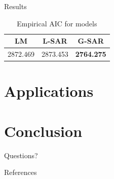 \documentclass[10pt,unknownkeysallowed]{beamer}
\begin{document}
\begin{frame}{Results}
\begin{table}[]
\begin{tabular}{ccc}
\hline
LM       & L-SAR    & G-SAR             \\ \hline
2872.469 & 2873.453 & \textbf{2764.275} \\ \hline
\end{tabular}
\caption{Empirical AIC for models}
\end{table}
\end{frame}

\section{Applications}



\section{Conclusion}

{
\begin{frame}[standout]
  Questions?
\end{frame}
}


\begin{frame}[allowframebreaks]{References}

  
  

\end{frame}
\end{document}
